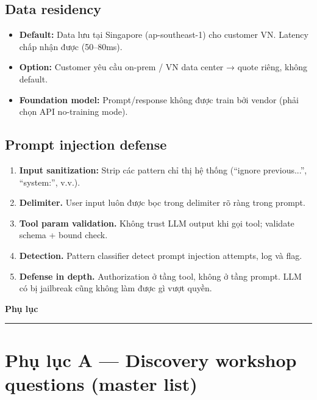 \documentclass[11pt,a4paper]{article}
\begin{document}
\subsection{Data residency}

\begin{itemize}
\item \textbf{Default:} Data lưu tại Singapore (ap-southeast-1) cho customer VN. Latency chấp nhận được (50--80ms).
\item \textbf{Option:} Customer yêu cầu on-prem / VN data center → quote riêng, không default.
\item \textbf{Foundation model:} Prompt/response không được train bởi vendor (phải chọn API no-training mode).
\end{itemize}

\subsection{Prompt injection defense}

\begin{enumerate}
\item \textbf{Input sanitization:} Strip các pattern chỉ thị hệ thống (``ignore previous...'', ``system:'', v.v.).
\item \textbf{Delimiter.} User input luôn được bọc trong delimiter rõ ràng trong prompt.
\item \textbf{Tool param validation.} Không trust LLM output khi gọi tool; validate schema + bound check.
\item \textbf{Detection.} Pattern classifier detect prompt injection attempts, log và flag.
\item \textbf{Defense in depth.} Authorization ở tầng tool, không ở tầng prompt. LLM có bị jailbreak cũng không làm được gì vượt quyền.
\end{enumerate}

\clearpage

\begin{center}
\vspace*{0.5em}
{\sffamily\bfseries\Huge\color{ink} Phụ lục}\\[0.5em]
{\color{mid}\rule{6cm}{0.4pt}}
\end{center}

\section*{Phụ lục A — Discovery workshop questions (master list)}
\end{document}
